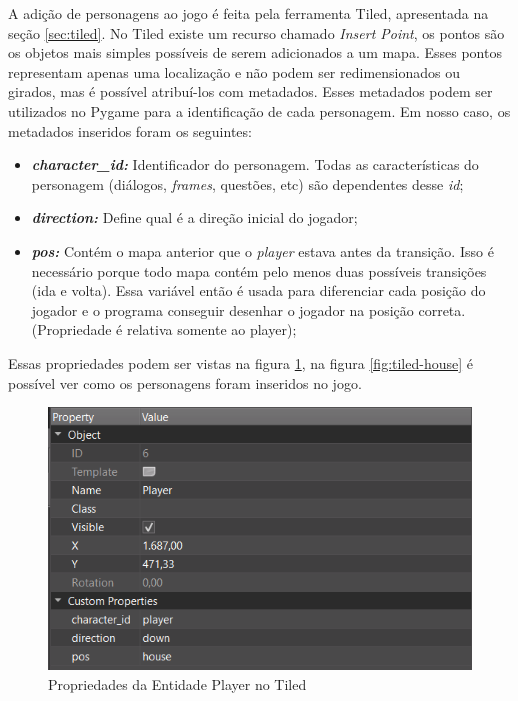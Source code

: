 A adição de personagens ao jogo é feita pela ferramenta Tiled, apresentada na seção \ref{sec:tiled}. No Tiled existe um recurso chamado \textit{Insert Point}, os pontos são os objetos mais simples possíveis de serem adicionados a um mapa. Esses pontos representam apenas uma localização e não podem ser redimensionados ou girados, mas é possível atribuí-los com metadados. Esses metadados podem ser utilizados no Pygame para a identificação de cada personagem. Em nosso caso, os metadados inseridos foram os seguintes:
\begin{itemize}
    \item \textbf{\textit{character\_id: }} Identificador do personagem. Todas as características do personagem (diálogos, \textit{frames}, questões, etc) são dependentes desse \textit{id};
    \item \textbf{\textit{direction: }}Define qual é a direção inicial do jogador;
    \item \textbf{\textit{pos:}} Contém o mapa anterior que o \textit{player} estava antes da transição. Isso é necessário porque todo mapa contém pelo menos duas possíveis transições (ida e volta). Essa variável então é usada para diferenciar cada posição do jogador e o programa conseguir desenhar o jogador na posição correta. (Propriedade é relativa somente ao player);
\end{itemize}

Essas propriedades podem ser vistas na figura \ref{fig:tiled-player-properties}, na figura \ref{fig:tiled-house} é possível ver como os personagens foram inseridos no jogo.
\begin{figure}[h!]
    \centering
    \includegraphics[width=0.5\linewidth]{figuras/tiled-player-properties.png}
    \caption{Propriedades da Entidade Player no Tiled}
    \label{fig:tiled-player-properties}
\end{figure}


